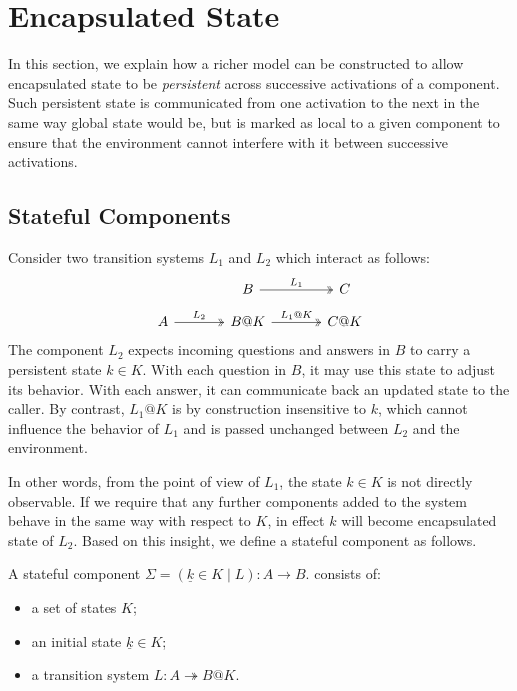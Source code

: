 \documentclass[acmsmall,screen,review,anonymous]{acmart}
\newcommand{\intl}[1]{\underline{#1}}
\begin{document}


\section{Encapsulated State} \label{sec:encap} %


In this section,
we explain how a richer model can be constructed
to allow encapsulated state
to be \emph{persistent} across
successive activations of a component.
Such persistent state
is communicated from one activation to the next
in the same way global state would be,
but is marked as local to a given component
to ensure that the environment cannot interfere
with it between successive activations.


\subsection{Stateful Components} %

Consider two transition systems $L_1$ and $L_2$
which interact as follows:
\[
  \begin{tikzcd}[row sep=small, column sep=large]
    & B \ar[r, twoheadrightarrow, "L_1"] & C \\
    A \ar[r, twoheadrightarrow, "L_2"] &
    B@K \ar[r, twoheadrightarrow, "L_1@K"] &
    C@K
  \end{tikzcd}
\]
The component $L_2$ expects
incoming questions and answers in $B$
to carry a persistent state $k \in K$.
With each question in $B$,
it may use this state to adjust its behavior.
With each answer,
it can communicate back an updated state to the caller.
By contrast,
$L_1@K$ is by construction insensitive to $k$,
which cannot influence the behavior of $L_1$
and is passed unchanged
between $L_2$ and the environment.

In other words,
from the point of view of $L_1$,
the state $k \in K$ is not directly observable.
If we require that any further components
added to the system
behave in the same way with respect to $K$,
in effect $k$ will become encapsulated state of $L_2$.
Based on this insight,
we define a stateful component as follows.

\begin{definition} \label{def:slts}
A stateful component
$\Sigma = (\intl{k} \in K \mid L) : A \rightarrow B$.
consists of:
\begin{itemize}
  \item a set of states $K$;
  \item an initial state $\intl{k} \in K$;
  \item a transition system $L : A \twoheadrightarrow B@K$.
\end{itemize}
\end{definition}
\end{document}
